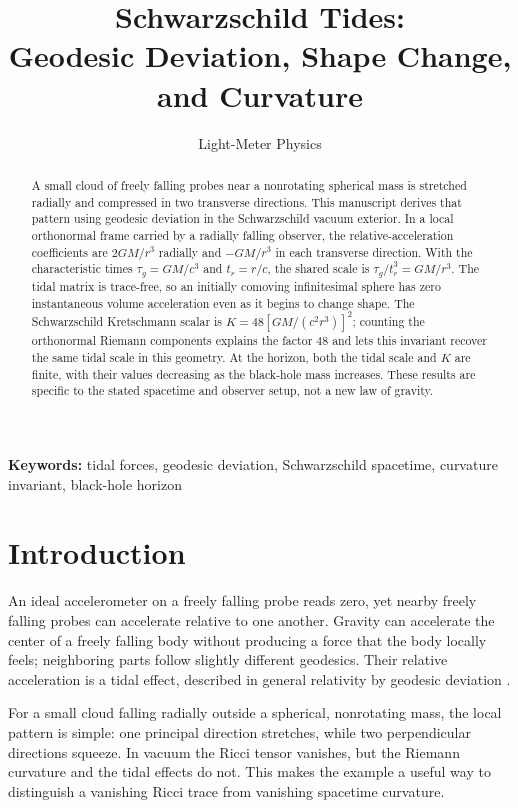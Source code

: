 \documentclass[12pt]{article}
\title{Schwarzschild Tides:\\
Geodesic Deviation, Shape Change, and Curvature}
\author{Light-Meter Physics}
\date{}
\begin{document}
\maketitle

\begin{abstract}
A small cloud of freely falling probes near a nonrotating spherical mass is stretched radially and compressed in two transverse directions. This manuscript derives that pattern using geodesic deviation in the Schwarzschild vacuum exterior. In a local orthonormal frame carried by a radially falling observer, the relative-acceleration coefficients are $2GM/r^3$ radially and $-GM/r^3$ in each transverse direction. With the characteristic times $\tau_g=GM/c^3$ and $t_r=r/c$, the shared scale is $\tau_g/t_r^3=GM/r^3$. The tidal matrix is trace-free, so an initially comoving infinitesimal sphere has zero instantaneous volume acceleration even as it begins to change shape. The Schwarzschild Kretschmann scalar is $K=48[GM/(c^2r^3)]^2$; counting the orthonormal Riemann components explains the factor $48$ and lets this invariant recover the same tidal scale in this geometry. At the horizon, both the tidal scale and $K$ are finite, with their values decreasing as the black-hole mass increases. These results are specific to the stated spacetime and observer setup, not a new law of gravity.
\end{abstract}

\noindent\textbf{Keywords:} tidal forces, geodesic deviation, Schwarzschild spacetime, curvature invariant, black-hole horizon

\section{Introduction}
\label{sec:introduction}

An ideal accelerometer on a freely falling probe reads zero, yet nearby freely falling probes can accelerate relative to one another. Gravity can accelerate the center of a freely falling body without producing a force that the body locally feels; neighboring parts follow slightly different geodesics. Their relative acceleration is a tidal effect, described in general relativity by geodesic deviation \cite{TongGR,HamiltonGR}.

For a small cloud falling radially outside a spherical, nonrotating mass, the local pattern is simple: one principal direction stretches, while two perpendicular directions squeeze. In vacuum the Ricci tensor vanishes, but the Riemann curvature and the tidal effects do not. This makes the example a useful way to distinguish a vanishing Ricci trace from vanishing spacetime curvature.
\end{document}

